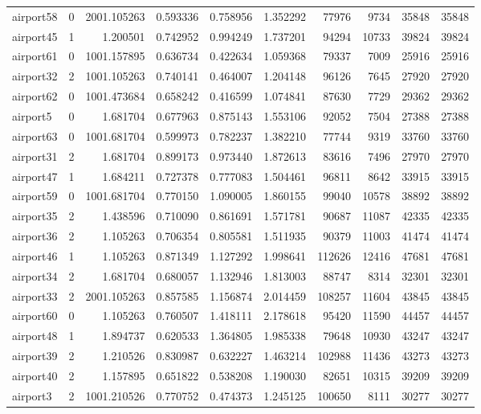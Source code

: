 \begin{longtable}{|l|r|r|r|r|r|r|r|r|r|}
airport58 & 0 & 2001.105263 & 0.593336 & 0.758956 & 1.352292 & 77976 & 9734 & 35848 & 35848 \\
airport45 & 1 & 1.200501 & 0.742952 & 0.994249 & 1.737201 & 94294 & 10733 & 39824 & 39824 \\
airport61 & 0 & 1001.157895 & 0.636734 & 0.422634 & 1.059368 & 79337 & 7009 & 25916 & 25916 \\
airport32 & 2 & 1001.105263 & 0.740141 & 0.464007 & 1.204148 & 96126 & 7645 & 27920 & 27920 \\
airport62 & 0 & 1001.473684 & 0.658242 & 0.416599 & 1.074841 & 87630 & 7729 & 29362 & 29362 \\
airport5 & 0 & 1.681704 & 0.677963 & 0.875143 & 1.553106 & 92052 & 7504 & 27388 & 27388 \\
airport63 & 0 & 1001.681704 & 0.599973 & 0.782237 & 1.382210 & 77744 & 9319 & 33760 & 33760 \\
airport31 & 2 & 1.681704 & 0.899173 & 0.973440 & 1.872613 & 83616 & 7496 & 27970 & 27970 \\
airport47 & 1 & 1.684211 & 0.727378 & 0.777083 & 1.504461 & 96811 & 8642 & 33915 & 33915 \\
airport59 & 0 & 1001.681704 & 0.770150 & 1.090005 & 1.860155 & 99040 & 10578 & 38892 & 38892 \\
airport35 & 2 & 1.438596 & 0.710090 & 0.861691 & 1.571781 & 90687 & 11087 & 42335 & 42335 \\
airport36 & 2 & 1.105263 & 0.706354 & 0.805581 & 1.511935 & 90379 & 11003 & 41474 & 41474 \\
airport46 & 1 & 1.105263 & 0.871349 & 1.127292 & 1.998641 & 112626 & 12416 & 47681 & 47681 \\
airport34 & 2 & 1.681704 & 0.680057 & 1.132946 & 1.813003 & 88747 & 8314 & 32301 & 32301 \\
airport33 & 2 & 2001.105263 & 0.857585 & 1.156874 & 2.014459 & 108257 & 11604 & 43845 & 43845 \\
airport60 & 0 & 1.105263 & 0.760507 & 1.418111 & 2.178618 & 95420 & 11590 & 44457 & 44457 \\
airport48 & 1 & 1.894737 & 0.620533 & 1.364805 & 1.985338 & 79648 & 10930 & 43247 & 43247 \\
airport39 & 2 & 1.210526 & 0.830987 & 0.632227 & 1.463214 & 102988 & 11436 & 43273 & 43273 \\
airport40 & 2 & 1.157895 & 0.651822 & 0.538208 & 1.190030 & 82651 & 10315 & 39209 & 39209 \\
airport3 & 2 & 1001.210526 & 0.770752 & 0.474373 & 1.245125 & 100650 & 8111 & 30277 & 30277 \\

\end{longtable}

